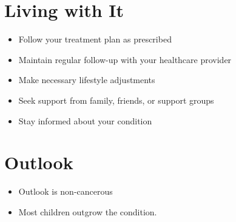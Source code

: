 \section{Living with It}
\begin{itemize}[noitemsep]
  \item Follow your treatment plan as prescribed
  \item Maintain regular follow-up with your healthcare provider
  \item Make necessary lifestyle adjustments
  \item Seek support from family, friends, or support groups
  \item Stay informed about your condition
\end{itemize}
\section{Outlook}
\begin{itemize}[noitemsep]
  \item Outlook is non-cancerous
  \item Most children outgrow the condition.
\end{itemize}
